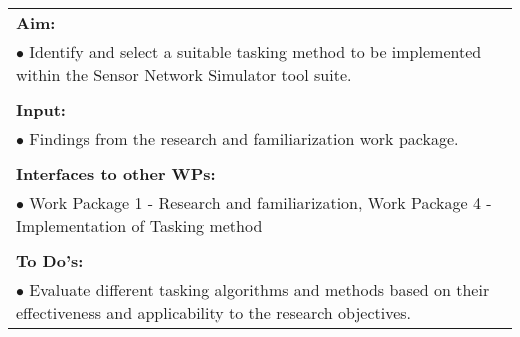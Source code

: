 \begin{table}[!h]
\begin{center}
\begin{tabular}{|p{35mm}||p{55mm}|p{50mm}||p{40mm}|}
      \hline\hline
      \multicolumn{4}{|p{150mm}|}{\textbf{Aim:}}                                                                                                                                                            \\
      \multicolumn{4}{|p{150mm}|}{$\bullet$ Identify and select a suitable tasking method to be implemented within the Sensor Network Simulator tool suite.}                                                   \\
      \multicolumn{4}{|p{150mm}|}{}                                                                                                                                                                           \\
      \multicolumn{4}{|p{150mm}|}{\textbf{Input:}}                                                                                                                                                            \\
      \multicolumn{4}{|p{150mm}|}{$\bullet$ Findings from the research and familiarization work package.}                                                                                                                                 \\
      \multicolumn{4}{|p{150mm}|}{}                                                                                                                                                                           \\
      \multicolumn{4}{|p{150mm}|}{\textbf{Interfaces to other WPs:}}                                                                                                                                    \\
      \multicolumn{4}{|p{150mm}|}{$\bullet$ Work Package 1 - Research and familiarization, Work Package 4 - Implementation of Tasking method}                                                                                              \\
      \multicolumn{4}{|p{150mm}|}{}                                                                                                                                                                           \\
      \multicolumn{4}{|p{150mm}|}{\textbf{To Do's:}}                                                                                                                                                         \\
      \multicolumn{4}{|p{150mm}|}{$\bullet$ Evaluate different tasking algorithms and methods based on their effectiveness and applicability to the research objectives.}\\

\end{tabular}
\end{center}
\end{table}
